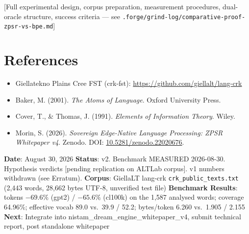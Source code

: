 \documentclass[11pt,oneside]{article}
\begin{document}
[Full experimental design, corpus preparation, measurement procedures, dual-oracle structure, success criteria --- see \texttt{.forge/grind-log/comparative-proof-zpsr-vs-bpe.md}]

\section*{References}

\begin{itemize}
  \item Giellatekno Plains Cree FST (crk-fst): \url{https://github.com/giellalt/lang-crk}
  \item Baker, M. (2001). \emph{The Atoms of Language}. Oxford University Press.
  \item Cover, T., \& Thomas, J. (1991). \emph{Elements of Information Theory}. Wiley.
  \item Morin, S. (2026). \emph{Sovereign Edge-Native Language Processing: ZPSR Whitepaper v4}. Zenodo. DOI: \href{https://doi.org/10.5281/zenodo.22020676}{10.5281/zenodo.22020676}.
\end{itemize}

\bigskip
\noindent
\textbf{Date}: August 30, 2026
\textbf{Status}: v2. Benchmark MEASURED 2026-08-30. Hypothesis verdicts [pending replication on ALTLab corpus]. v1 numbers withdrawn (see Erratum).
\textbf{Corpus}: GiellaLT lang-crk \texttt{crk\_public\_texts.txt} (2,443 words, 28,662 bytes UTF-8, unverified test file)
\textbf{Benchmark Results}: tokens $-69.6\%$ (gpt2) / $-65.6\%$ (cl100k) on the 1,587 analysed words; coverage 64.96\%; effective vocab 89.0 vs.\ 39.9 / 52.2; bytes/token 6.260 vs.\ 1.905 / 2.155
\textbf{Next}: Integrate into nistam\_dream\_engine\_whitepaper\_v4, submit technical report, post standalone whitepaper
\end{document}
